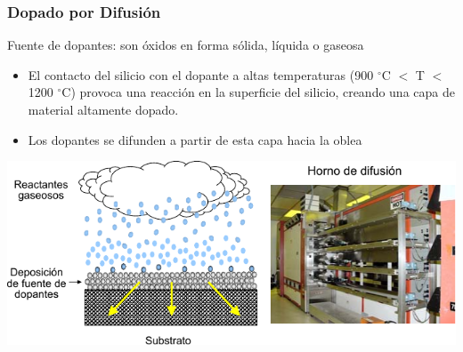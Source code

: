 \documentclass[aspectratio=169,10pt]{beamer}
\begin{document}
\begin{frame}
\frametitle{Dopado por Difusión}
Fuente de dopantes: son óxidos en forma sólida, líquida o gaseosa

\begin{itemize}
\item El contacto del silicio con el dopante a altas temperaturas (900 $^\circ$C $<$ T $<$ 1200 $^\circ$C) provoca una reacción en la superficie del silicio, creando una capa de material altamente dopado.
\item Los dopantes se difunden a partir de esta capa hacia la oblea
\end{itemize}

\centering
\includegraphics[width=14cm]{doping-diff}
\end{frame}
\end{document}

